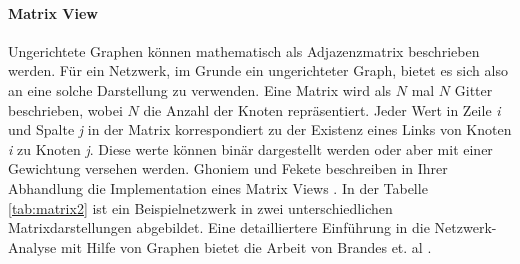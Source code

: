 \documentclass[draft=false
              ,paper=a4
              ,twoside=false
              ,fontsize=11pt
              ,headsepline
              ,BCOR10mm
              ,DIV11
              ]{scrbook}
\begin{document}
\paragraph{Matrix View} %
\label{par:matrix_view}
Ungerichtete Graphen können mathematisch als Adjazenzmatrix beschrieben werden. Für ein Netzwerk, im Grunde ein ungerichteter Graph, bietet es sich also an eine solche Darstellung zu verwenden. Eine Matrix wird als $N$ mal $N$ Gitter beschrieben, wobei $N$ die Anzahl der Knoten repräsentiert. Jeder Wert in Zeile \textit{i} und Spalte \textit{j} in der Matrix korrespondiert zu der Existenz eines Links von Knoten \textit{i} zu Knoten \textit{j}. Diese werte können binär dargestellt werden oder aber mit einer Gewichtung versehen werden. Ghoniem und Fekete beschreiben in Ihrer Abhandlung die Implementation eines Matrix Views \cite{Ghoniem:2003:MVG:1063669.1063698}. In der Tabelle \ref{tab:matrix2} ist ein Beispielnetzwerk in zwei unterschiedlichen Matrixdarstellungen abgebildet. Eine detailliertere Einführung in die Netzwerk-Analyse mit Hilfe von Graphen bietet die Arbeit von Brandes et. al \cite{brandes2005network}.
\end{document}
